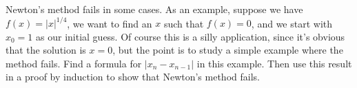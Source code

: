 Newton's method fails in some cases.
As an example, suppose we have $f(x)=|x|^{1/4}$,
we want to find an $x$ such that $f(x)=0$, and we
start with $x_0=1$ as our initial guess. Of course this
is a silly application, since it's obvious that the
solution is $x=0$, but the point is to study a simple
example where the method fails. Find a formula for
$|x_n-x_{n-1}|$ in this example.
Then use this result in a proof by induction
to show that Newton's method fails.
